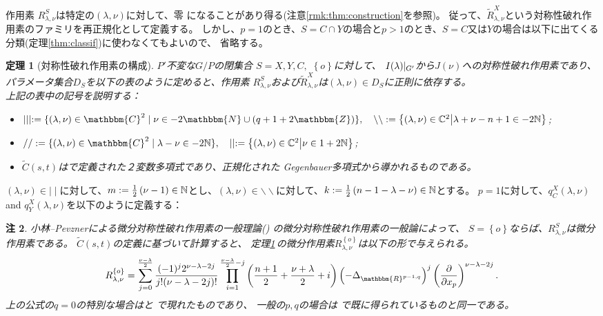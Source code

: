 \documentclass[12pt]{article} %
\newcommand{\assign}{:=}
\newtheorem{theorem}{定理}
\newtheorem{remark}[theorem]{注}
\theoremstyle{definition}
\theoremstyle{exampstyle} \newtheorem{examp}[theorem]{Theorem}
\newcommand{\IlambdaGprime}{I(\lambda)\kern-0.3em\mid_{G'}}
\newcommand{\bb}{\backslash\backslash}
\begin{document}
作用素
$R_{\lambda,\nu}^S$は特定の$(\lambda,\nu)$に対して、零
になることがあり得る(注意\ref{rmk:thm:construction}を参照)。
従って、$\tilde{R}^X_{\lambda,\nu}$という対称性破れ作用素のファミリを再正規化として定義する。
しかし、$p=1$のとき、$S=C\cap Y$の場合と$p>1$のとき、$S=C$又は$Y$の場合は以下に出てくる分類(定理\ref{thm:classif})に使わなくてもよいので、
省略する。
\newpage
\begin{theorem}[対称性破れ作用素の構成]\label{thm:construction}
	$P'$不変な$G/P$の閉集合
	$S=X,Y,C,$ $\left\{ o \right\}$に対して、
	$\IlambdaGprime$から$J(\nu)$への対称性破れ作用素であり、
	パラメータ集合$D_S$を以下の表のように定めると、作用素
	$R_{\lambda,\nu}^S$および$\tilde{R}_{\lambda,\nu}^X$は$(\lambda,\nu)\in D_S$に正則に依存する。
	\\
\vspace{\baselineskip}
上記の表中の記号を説明する：
\begin{itemize}
	\item $\mid \mid \mid \assign \{ (\lambda, \nu) \in \mathbbm{C}^2 \mid \nu \in
	- 2\mathbbm{N} \cup (q + 1 + 2\mathbbm{Z}) \},\quad \backslash\backslash:=\mysetn{(\lambda,\nu)\in\C^2}{\lambda+\nu-n+1\in-2\N}$;
\item $/ / \assign
\{ (\lambda, \nu) \in \mathbbm{C}^2 \mid \lambda - \nu \in
-2\N \},\quad \mid\mid:=\mysetn{(\lambda,\nu)\in\C^2}{\nu\in1+2\N}$;
\item $\tilde{C}(s,t)$は\cite[(16.3)]{kobayashi2015symmetry}で定義された２変数多項式であり、正規化された
	Gegenbauer多項式から導かれるものである。
\end{itemize}
\end{theorem}
$(\lambda,\nu)\in\mid\mid$に対して、$m:=\frac{1}{2}\left( \nu-1 \right)\in\mathbb{N}$とし、$(\lambda,\nu)\in\bb$に対して、$k:=\frac{1}{2}\left( n-1-\lambda-\nu \right)\in\mathbb{N}$とする。
$p=1$に対して、$q_C^X(\lambda,\nu)$ and $q_Y^X(\lambda,\nu)$を以下のように定義する：
\begin{remark}
	小林--Pevznerによる微分対称性破れ作用素の一般理論(\cite[Chap.\ 2]{kobayashi2016differential1})
	の微分対称性破れ作用素の一般論によって、
	$S=\left\{ o \right\}$ならば、$R_{\lambda,\nu}^S$は微分作用素である。
	$\tilde{C}(s,t)$の定義に基づいて計算すると、
	定理\ref{thm:construction}\,の微分作用素$R_{\lambda,\nu}^{ \left\{ o \right\}}$は以下の形で与えられる。
	\begin{equation*}
		R_{\lambda,\nu}^{ \left\{ o \right\}}=
		\sum_{j=0}^{\frac{\nu-\lambda}{2}}\frac{(-1)^j2^{\nu-\lambda-2j}}{j!(\nu-\lambda-2j)!}\prod_{i=1}^{\frac{\nu-\lambda}{2}-j}\left( \frac{n
		+1}{2}+\frac{\nu+\lambda}{2}
		+i \right)\left(- \Delta_{\mathbbm{R}^{p-1,q}} \right)^j\left( \frac{\partial}{\partial x_p} \right)^{\nu-\lambda-2j}.
	\end{equation*}
	上の公式の$q=0$の特別な場合は\cite[Thms. 5.1.1 and 5.2.1]{juhl2009families}と\cite[(10.1)]{kobayashi2015symmetry}
	で現れたものであり、
	一般の$p,q$の場合は
	\cite[Thm.\ 4.3]{kobayashi2015branching}で既に得られているものと同一である。
\end{remark}
\end{document}

